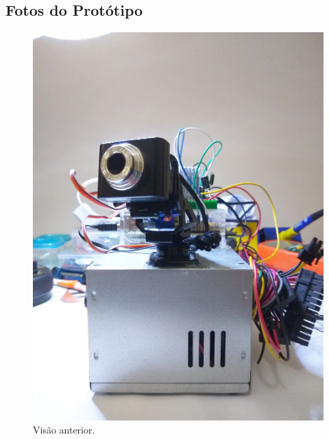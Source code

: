 
\begin{apendicesenv}
\partapendices





\chapter{Fotos do Protótipo} %
\label{chap:fotosprototipo}

\begin{figure}[H]
	\centering
	\includegraphics[width=1\linewidth]{figuras/vista_frontal}
	\caption{Visão anterior.}
	\label{fig:vistafrontal}
\end{figure}


\end{apendicesenv}
